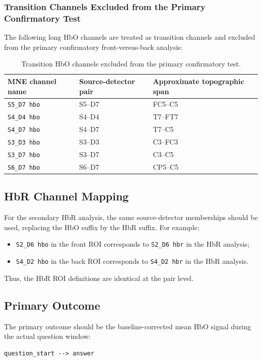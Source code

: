 \documentclass[11pt]{article}
\begin{document}
\subsubsection{Transition Channels Excluded from the Primary Confirmatory Test}
The following long HbO channels are treated as transition channels and excluded from the primary
confirmatory front-versus-back analysis:

\begin{table}[ht]
\centering
\caption{Transition HbO channels excluded from the primary confirmatory test.}
\label{tab:transition_hbo}
\begin{tabular}{lll}
\hline
MNE channel name & Source-detector pair & Approximate topographic span \\
\hline
\texttt{S5\_D7 hbo} & S5--D7 & FC5--C5 \\
\texttt{S4\_D4 hbo} & S4--D4 & T7--FT7 \\
\texttt{S4\_D7 hbo} & S4--D7 & T7--C5 \\
\texttt{S3\_D3 hbo} & S3--D3 & C3--FC3 \\
\texttt{S3\_D7 hbo} & S3--D7 & C3--C5 \\
\texttt{S6\_D7 hbo} & S6--D7 & CP5--C5 \\
\hline
\end{tabular}
\end{table}

\subsection{HbR Channel Mapping}
For the secondary HbR analysis, the same source-detector memberships should be used, replacing
the HbO suffix by the HbR suffix.
For example:
\begin{itemize}
    \item \texttt{S2\_D6 hbo} in the front ROI corresponds to \texttt{S2\_D6 hbr} in the HbR analysis;
    \item \texttt{S4\_D2 hbo} in the back ROI corresponds to \texttt{S4\_D2 hbr} in the HbR analysis.
\end{itemize}

Thus, the HbR ROI definitions are identical at the pair level.

\subsection{Primary Outcome}
The primary outcome should be the baseline-corrected mean HbO signal during the actual question window:
\begin{verbatim}
question_start --> answer
\end{verbatim}
\end{document}
